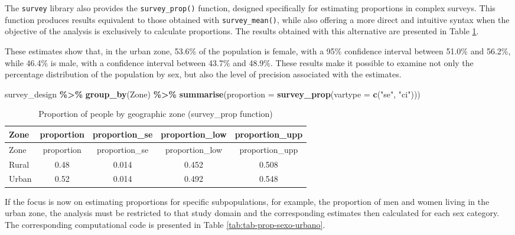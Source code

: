 \documentclass[
  english,
  12pt,
]{book}
\newenvironment{Shaded}{\begin{snugshade}}{\end{snugshade}}
\newcommand{\AttributeTok}[1]{\textcolor[rgb]{0.13,0.29,0.53}{#1}}
\newcommand{\FunctionTok}[1]{\textcolor[rgb]{0.13,0.29,0.53}{\textbf{#1}}}
\newcommand{\NormalTok}[1]{#1}
\newcommand{\SpecialCharTok}[1]{\textcolor[rgb]{0.81,0.36,0.00}{\textbf{#1}}}
\newcommand{\StringTok}[1]{\textcolor[rgb]{0.31,0.60,0.02}{#1}}
\begin{document}
The \texttt{survey} library also provides the \texttt{survey\_prop()} function, designed specifically for estimating proportions in complex surveys. This function produces results equivalent to those obtained with \texttt{survey\_mean()}, while also offering a more direct and intuitive syntax when the objective of the analysis is exclusively to calculate proportions. The results obtained with this alternative are presented in Table \ref{tab:tab-prop-zona2}.

These estimates show that, in the urban zone, 53.6\% of the population is female, with a 95\% confidence interval between 51.0\% and 56.2\%, while 46.4\% is male, with a confidence interval between 43.7\% and 48.9\%. These results make it possible to examine not only the percentage distribution of the population by sex, but also the level of precision associated with the estimates.

\begin{Shaded}
\begin{Highlighting}[]
\NormalTok{survey\_design }\SpecialCharTok{\%\textgreater{}\%}
  \FunctionTok{group\_by}\NormalTok{(Zone) }\SpecialCharTok{\%\textgreater{}\%}
  \FunctionTok{summarise}\NormalTok{(}\AttributeTok{proportion =} \FunctionTok{survey\_prop}\NormalTok{(}\AttributeTok{vartype =} \FunctionTok{c}\NormalTok{(}\StringTok{"se"}\NormalTok{, }\StringTok{"ci"}\NormalTok{)))}
\end{Highlighting}
\end{Shaded}

\begin{longtable}[]{@{}lcccc@{}}
\caption{\label{tab:tab-prop-zona2}Proportion of people by geographic zone (survey\_prop function)}\tabularnewline
\toprule\noalign{}
Zone & proportion & proportion\_se & proportion\_low & proportion\_upp \\
\midrule\noalign{}
\endfirsthead
\toprule\noalign{}
Zone & proportion & proportion\_se & proportion\_low & proportion\_upp \\
\midrule\noalign{}
\endhead
\bottomrule\noalign{}
\endlastfoot
Rural & 0.48 & 0.014 & 0.452 & 0.508 \\
Urban & 0.52 & 0.014 & 0.492 & 0.548 \\
\end{longtable}

If the focus is now on estimating proportions for specific subpopulations, for example, the proportion of men and women living in the urban zone, the analysis must be restricted to that study domain and the corresponding estimates then calculated for each sex category. The corresponding computational code is presented in Table \ref{tab:tab-prop-sexo-urbano}.
\end{document}
